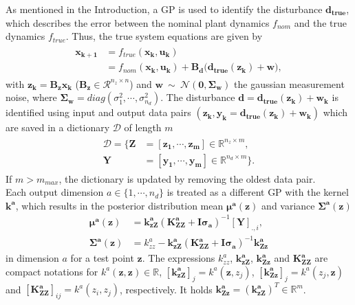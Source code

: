 \documentclass[letterpaper, 10 pt, conference]{ieeeconf}  %
\newcommand{\R}{\mathbb{R}}
\begin{document}
As mentioned in the Introduction, a GP is used to identify the disturbance $\boldsymbol{d_{true}}$, which describes the error between the nominal plant dynamics $f_{nom}$ and the true dynamics $f_{true}$. Thus, the true system equations are given by
\begin{align}
\begin{split}
\boldsymbol{x_{k+1}} &= f_{true}(\boldsymbol{x_k},\boldsymbol{u_k}) \\
        &=  f_{nom}(\boldsymbol{x_k},\boldsymbol{u_k}) + \boldsymbol{B_d}\big(\boldsymbol{d_{true}}(\boldsymbol{z_k})+ \boldsymbol{w}\big),
\end{split}
\end{align}
with $\boldsymbol{z_k} = \boldsymbol{B_z} \boldsymbol{x_k}$ ($\boldsymbol{B_z} \in \mathcal{R}^{n_z \times n}$) and $\boldsymbol{w}~\sim~\mathcal{N}(\boldsymbol{0},\boldsymbol{\Sigma_w})$  the gaussian measurement noise, where $\boldsymbol{\Sigma_w}= diag(\sigma_1^2, \cdots ,\sigma_{n_d}^2)$.
The disturbance $\boldsymbol{d} = \boldsymbol{d_{true}}(\boldsymbol{z_k}) + \boldsymbol{w_k}$ is identified using input and output data pairs $(\boldsymbol{z_k},\boldsymbol{y_k}=\boldsymbol{d_{true}}(\boldsymbol{z_k})+\boldsymbol{w_k})$ which are saved in a dictionary $\mathcal{D}$ of length $m$
\begin{align}
\begin{split}
\mathcal{D} = \{\boldsymbol{Z} &=[\boldsymbol{z_1}, \cdots, 		\boldsymbol{z_m}] \in \R^{n_z \times m} , \\
                \boldsymbol{Y} &=[\boldsymbol{y_{1}},\cdots,\boldsymbol{y_{m}}]\in \R^{n_d \times m} \}.
\end{split}
\end{align}
If $m>m_{max}$, the dictionary is updated by removing the oldest data pair.\\
Each output dimension $a \in \{1, \cdots, n_d\}$ is treated as a different GP with the kernel $\boldsymbol{k^a}$, which results in the posterior distribution mean $\boldsymbol{\mu^a(z)}$ and variance $\boldsymbol{\Sigma^a(z)}$
\begin{align}
\boldsymbol{\mu^a(z)} &= \boldsymbol{k_{zZ}^a}( \boldsymbol{K_{ZZ}^a} +\boldsymbol{I} \boldsymbol{\sigma_a})^{-1}[\boldsymbol{Y}]_{.,i},\\
\boldsymbol{\Sigma^a(z)} &= k_{zz}^a-\boldsymbol{k_{zZ}^a} ( \boldsymbol{K_{ZZ}^a} +\boldsymbol{I} \boldsymbol{\sigma_a})^{-1} \boldsymbol{k_{Zz}^a}
\end{align}
in dimension $a$ for a test point $\boldsymbol{z}$.
The expressions $k_{zz}^a$, $ \boldsymbol{k_{zZ}^a}$, $\boldsymbol{k_{Zz}^a}$ and $\boldsymbol{K_{ZZ}^a}$ are compact notations for $k^a(\boldsymbol{z},\boldsymbol{z}) \in \R$, $[\boldsymbol{k_{zZ}^a}]_j =k^a(\boldsymbol{z},z_j)$, $[\boldsymbol{k_{Zz}^a}]_j =k^a(z_j,\boldsymbol{z})$ and $[\boldsymbol{K_{ZZ}^a}]_{ij} = k^a(z_i,z_j)$, respectively. It holds $\boldsymbol{k_{Zz}^a}=(\boldsymbol{k_{zZ}^a})^T \in \R^m$.\\
\end{document}
